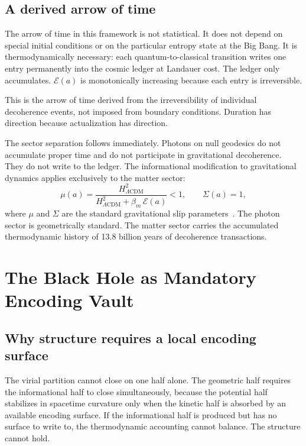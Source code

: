 \documentclass[12pt,a4paper]{article}
\begin{document}
\subsection{A derived arrow of time}

The arrow of time in this framework is not statistical. It does not depend
on special initial conditions or on the particular entropy state at the
Big Bang. It is thermodynamically necessary: each quantum-to-classical
transition writes one entry permanently into the cosmic ledger at Landauer
cost. The ledger only accumulates. $\mathcal{E}(a)$ is monotonically
increasing because each entry is irreversible.

This is the arrow of time derived from the irreversibility of individual
decoherence events, not imposed from boundary conditions. Duration has
direction because actualization has direction.

The sector separation follows immediately. Photons on null geodesics do
not accumulate proper time and do not participate in gravitational
decoherence. They do not write to the ledger. The informational
modification to gravitational dynamics applies exclusively to the matter
sector:
\begin{equation}
\mu(a) = \frac{H^2_{\Lambda\mathrm{CDM}}}{H^2_{\Lambda\mathrm{CDM}}
+ \beta_m\,\mathcal{E}(a)} < 1, \qquad \Sigma(a) = 1,
\label{eq:sector}
\end{equation}
where $\mu$ and $\Sigma$ are the standard gravitational slip
parameters~\citep{Bertschinger2008}. The photon sector is geometrically
standard. The matter sector carries the accumulated thermodynamic history
of 13.8 billion years of decoherence transactions.

\section{The Black Hole as Mandatory Encoding Vault}
\label{sec:bh}

\subsection{Why structure requires a local encoding surface}

The virial partition cannot close on one half alone. The geometric half
requires the informational half to close simultaneously, because the
potential half stabilizes in spacetime curvature only when the kinetic
half is absorbed by an available encoding surface. If the informational
half is produced but has no surface to write to, the thermodynamic
accounting cannot balance. The structure cannot hold.
\end{document}
